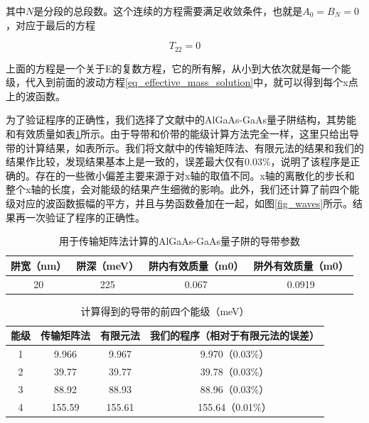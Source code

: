 \documentclass[oneside]{ZJUthesis}
\begin{document}
其中$N$是分段的总段数。这个连续的方程需要满足收敛条件，也就是$A_0=B_N=0$，对应于最后的方程

\begin{equation}
    \label{eq_t22}
    T_{22}=0
\end{equation}

上面的方程是一个关于E的复数方程，它的所有解，从小到大依次就是每一个能级，代入到前面的波动方程\ref{eq_effective_mass_solution}中，就可以得到每个x点上的波函数。

为了验证程序的正确性，我们选择了文献中的AlGaAs-GaAs量子阱结构\cite{jonsson1990solving}，其势能和有效质量如表\ref{tmm_sample}所示。由于导带和价带的能级计算方法完全一样，这里只给出导带的计算结果，如表所示。我们将文献中的传输矩阵法\cite{jonsson1990solving}、有限元法\cite{nakamura1989finite}的结果和我们的结果作比较，发现结果基本上是一致的，误差最大仅有0.03\%，说明了该程序是正确的。存在的一些微小偏差主要来源于对x轴的取值不同。x轴的离散化的步长和整个x轴的长度，会对能级的结果产生细微的影响。此外，我们还计算了前四个能级对应的波函数振幅的平方，并且与势函数叠加在一起，如图\ref{fig_waves}所示。结果再一次验证了程序的正确性。

\begin{table}[!t]
    \caption{用于传输矩阵法计算的AlGaAs-GaAs量子阱的导带参数}
    \centering
    \label{tmm_sample}
    \begin{tabular}{cccc}
        \hline
        阱宽（nm） & 阱深（meV） & 阱内有效质量（m0） & 阱外有效质量（m0）\\
        \hline
        20                & 225                 & 0.067                          & 0.0919\\
        \hline
    \end{tabular}
\end{table}

\begin{table}[!t]
    \caption{计算得到的导带的前四个能级（meV）}
    \centering
    \label{tmm_sample_result}
    \begin{tabular}{cccc}
        \hline
        能级 & 传输矩阵法\cite{jonsson1990solving} & 有限元法\cite{nakamura1989finite} & 我们的程序（相对于有限元法的误差） \\
        \hline
        1       & 9.966              & 9.967            & 9.970（0.03\%） \\
        2       & 39.77              & 39.77            & 39.78（0.03\%） \\
        3       & 88.92              & 88.93            & 88.96（0.03\%） \\
        4       & 155.59            & 155.61          & 155.64（0.01\%） \\
        \hline
    \end{tabular}
\end{table}
\end{document}
